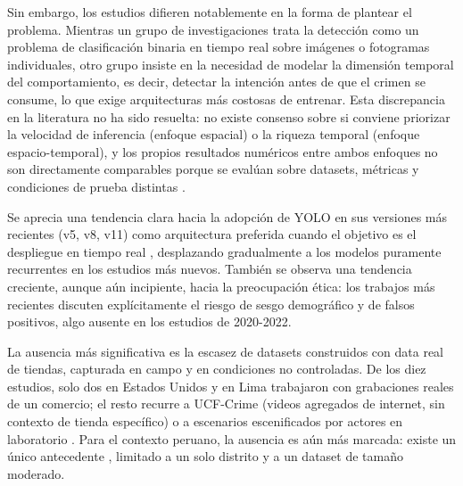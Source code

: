 Sin embargo, los estudios difieren notablemente en la forma de plantear el problema. Mientras un grupo de investigaciones \cite{hameed_real_2025, v_deep_2024, aguero_intelligent_2025} trata la detección como un problema de clasificación binaria en tiempo real sobre imágenes o fotogramas individuales, otro grupo \cite{martinez-mascorro_suspicious_2021, ansari_optimized_2023, chinthulla_deep_2025} insiste en la necesidad de modelar la dimensión temporal del comportamiento, es decir, detectar la intención antes de que el crimen se consume, lo que exige arquitecturas más costosas de entrenar. Esta discrepancia en la literatura no ha sido resuelta: no existe consenso sobre si conviene priorizar la velocidad de inferencia (enfoque espacial) o la riqueza temporal (enfoque espacio-temporal), y los propios resultados numéricos entre ambos enfoques no son directamente comparables porque se evalúan sobre datasets, métricas y condiciones de prueba distintas \cite{rashvand_exploring_2025}.

Se aprecia una tendencia clara hacia la adopción de YOLO en sus versiones más recientes (v5, v8, v11) como arquitectura preferida cuando el objetivo es el despliegue en tiempo real \cite{hameed_real_2025, aguero_intelligent_2025, m_intelligent_2025, m_deep_2023}, desplazando gradualmente a los modelos puramente recurrentes en los estudios más nuevos. También se observa una tendencia creciente, aunque aún incipiente, hacia la preocupación ética: los trabajos más recientes \cite{hameed_real_2025, rashvand_exploring_2025} discuten explícitamente el riesgo de sesgo demográfico y de falsos positivos, algo ausente en los estudios de 2020-2022.

La ausencia más significativa es la escasez de datasets construidos con data real de tiendas, capturada en campo y en condiciones no controladas. De los diez estudios, solo dos \cite{rashvand_exploring_2025} en Estados Unidos y \cite{aguero_intelligent_2025} en Lima trabajaron con grabaciones reales de un comercio; el resto recurre a UCF-Crime (videos agregados de internet, sin contexto de tienda específico) o a escenarios escenificados por actores en laboratorio \cite{chinthulla_deep_2025, m_deep_2023, m_intelligent_2025}. Para el contexto peruano, la ausencia es aún más marcada: existe un único antecedente \cite{aguero_intelligent_2025}, limitado a un solo distrito y a un dataset de tamaño moderado.

